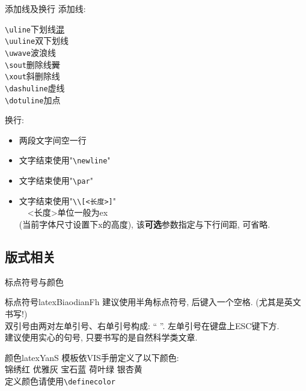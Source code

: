 \documentclass[hyperref,UTF8,11pt]{beamer}
\begin{document}
\begin{frame}[fragile]{添加线及换行}
	\onslide<1->
	添加线:
	\begin{multicols}{2}
		\verb|\uline|\hfill 下划线\qquad\uline{混}\\
		\verb|\uuline|\hfill 双下划线\qquad{}\\
		\verb|\uwave|\hfill 波浪线\qquad{}\\
		\verb|\sout|\hfill 删除线\qquad\sout{翼}\\
		\verb|\xout|\hfill 斜删除线\qquad{}\\
		\verb|\dashuline|\hfill 虚线\qquad{}\\
		\verb|\dotuline|\hfill 加点\qquad{}
	\end{multicols}
	换行:
	\begin{multicols}{2}
		\begin{itemize}
			\item 两段文字间空一行
			\item 文字结束使用"\verb!\newline!"
			\item 文字结束使用"\verb!\par!"
			\item 文字结束使用"\verb!\\[<长度>]!"\\
			~~<长度>单位一般为ex\\(当前字体尺寸设置下x的高度), 该\textbf{可选}参数指定与下行间距, 可省略.
		\end{itemize}
	\end{multicols}
\end{frame}

\subsection{版式相关}
\begin{frame}[fragile]{标点符号与颜色}
	\scriptsize
	\begin{SCUshow}{标点符号}{latex}{}{BiaodianFh}
		建议使用半角标点符号, 后键入一个空格. (尤其是英文书写!)\\[1ex]
		双引号由两对左单引号、右单引号构成: ``  ''. 左单引号在键盘上ESC键下方.\\[1ex]
		建议使用实心的句号, 只要书写的是自然科学类文章.
	\end{SCUshow}
	\begin{SCUshow}{颜色}{latex}{}{YanS}
		模板依VIS手册定义了以下颜色:\\
		\textcolor{JXred}{锦绣红}
		\textcolor{YYgrey}{优雅灰}
		\textcolor{BSblue}{宝石蓝}
		\textcolor{HYgreen}{荷叶绿}
		\textcolor{YXyellow}{银杏黄}\\
		定义颜色请使用\verb|\definecolor|
	\end{SCUshow}
\end{frame}
	
\end{document}
